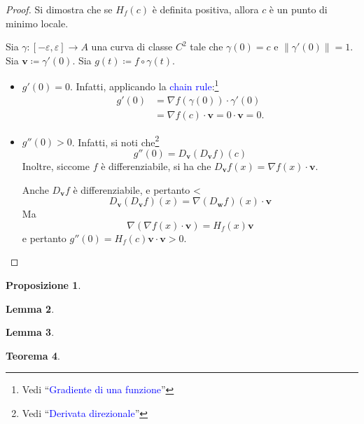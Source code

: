 \documentclass[10pt]{book}
\newcommand{\1}{\mathds{1}}
\newcommand{\norma}[1]{%
\left\lVert#1\right\rVert%
}
\theoremstyle{definition}%
\newtheorem{thm}{Teorema}[section]
\newtheorem{lem}[thm]{Lemma}
\newtheorem{prop}[thm]{Proposizione}
\theoremstyle{plain}
\theoremstyle{remark}
\renewcommand{\href}[2]{\textcolor{blue}{#2}}
\begin{document}
\begin{proof}
Si dimostra che se \(H_{f}(c)\) è definita positiva, allora \(c\) è un punto di minimo locale.

Sia \(\gamma:[-\varepsilon,\varepsilon]\to A\) una curva di classe \(C^{2}\) tale che \(\gamma(0) = c\) e \(\norma{\gamma'(0)} = 1\). Sia \(\bm{v} \coloneqq \gamma'(0)\). Sia \(g(t) \coloneqq f\circ\gamma(t)\).
\begin{itemize}
\item \(g'(0) = 0\). Infatti, applicando la \href{../../../../../org/roam/20250702114407-chain_rule.org}{chain rule}:\footnote{Vedi ``\href{../../../../../org/roam/20250624171244-gradiente_di_una_funzione.org}{Gradiente di una funzione}''}
\begin{align*}
  g'(0) &= \nabla f (\gamma(0)) \cdot \gamma'(0)\\
  &= \nabla f(c) \cdot \bm{v} = 0\cdot \bm{v}=0.
\end{align*}
\item \(g''(0) >0\). Infatti, si noti che\footnote{Vedi ``\href{../../../../../org/roam/20250702114642-derivata_direzionale.org}{Derivata direzionale}''}
\begin{equation*}
  g''(0) = D_{\bm{v}}\left(D_{\bm{v}} f\right)(c)
\end{equation*}
Inoltre, siccome \(f\) è differenziabile, si ha che \(D_{\bm{v}} f(x) = \nabla f (x)\cdot \bm{v}\).

Anche \(D_{\bm{v}}f\) è differenziabile, e pertanto <
\begin{equation*}
  D_{\bm{v}}\left(D_{\bm{v}} f\right)(x) = \nabla (D_{\bm{w}}f) (x)\cdot \bm{v}
\end{equation*}
Ma
\begin{equation*}
  \nabla(\nabla f (x)\cdot \bm{v}) = H_{f}(x) \bm{v}
\end{equation*}
e pertanto \(g''(0) = H_{f}(c)\bm{v}\cdot\bm{v}>0\).\qedhere
\end{itemize}
\end{proof}
\begin{prop}
\lipsum[1]
\end{prop}
\begin{lem}
\lipsum[2]
\end{lem}

\begin{lem}
\lipsum[3]
\end{lem}

\begin{thm}
\lipsum[4]
\end{thm}
\end{document}
